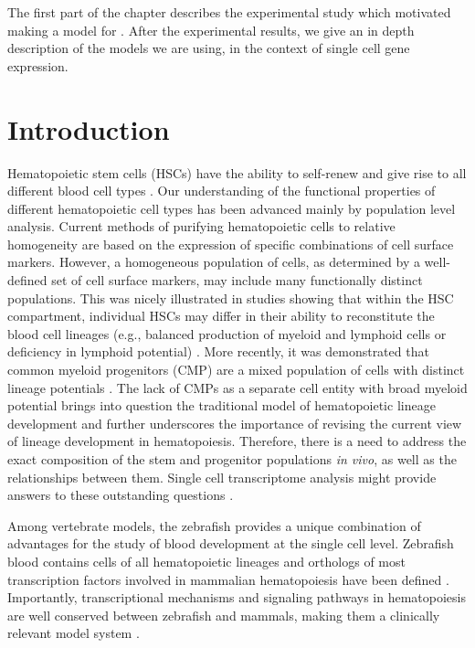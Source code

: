 The first part of the chapter describes the experimental study which motivated making a model for . After the experimental results, we give an in depth description of the models we are using, in the context of single cell gene expression.

\section{Introduction}

Hematopoietic stem cells (HSCs) have the ability to self-renew and give rise to all different blood cell types \cite{Orkin2008-os}. Our understanding of the functional properties of different hematopoietic cell types has been advanced mainly by population level analysis. Current methods of purifying hematopoietic cells to relative homogeneity are based on the expression of specific combinations of cell surface markers. However, a homogeneous population of cells, as determined by a well-defined set of cell surface markers, may include many functionally distinct populations. This was nicely illustrated in studies showing that within the HSC compartment, individual HSCs may differ in their ability to reconstitute the blood cell lineages (e.g., balanced production of myeloid and lymphoid cells or deficiency in lymphoid potential) \cite{Muller-Sieburg2012-vb}. More recently, it was demonstrated that common myeloid progenitors (CMP) are a mixed population of cells with distinct lineage potentials \cite{Notta2015-ng}. The lack of CMPs as a separate cell entity with broad myeloid potential brings into question the traditional model of hematopoietic lineage development and further underscores the importance of revising the current view of lineage development in hematopoiesis. Therefore, there is a need to address the exact composition of the stem and progenitor populations \textit{in vivo}, as well as the relationships between them. Single cell transcriptome analysis might provide answers to these outstanding questions \cite{Cvejic2015-ra}.

Among vertebrate models, the zebrafish provides a unique combination of advantages for the study of blood development at the single cell level. Zebrafish blood contains cells of all hematopoietic lineages and orthologs of most transcription factors involved in mammalian hematopoiesis have been defined \cite{Hsia2005-fg, Song2004-jn}. Importantly, transcriptional mechanisms and signaling pathways in hematopoiesis are well conserved between zebrafish and mammals, making them a clinically relevant model system \cite{Jagannathan-Bogdan2013-du}.

